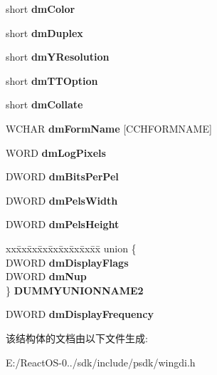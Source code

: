 \begin{DoxyCompactItemize}
\begin{tabbing}
\end{tabbing}\item 
\mbox{\label{struct__devicemode_w_af629c90bdef06e2b2b15ee471102a58e}} 
short {\bfseries dm\+Color}
\item 
\mbox{\label{struct__devicemode_w_a4b2dc9c4eb40cb65f1eb1f663fee7574}} 
short {\bfseries dm\+Duplex}
\item 
\mbox{\label{struct__devicemode_w_ac84418e4efc91b25b8ebc3cc38a8d51b}} 
short {\bfseries dm\+Y\+Resolution}
\item 
\mbox{\label{struct__devicemode_w_a06d241b62f61ebc8f5f9504af59cfa94}} 
short {\bfseries dm\+T\+T\+Option}
\item 
\mbox{\label{struct__devicemode_w_afc77f5b4a6608846ab790ded1a98d1f0}} 
short {\bfseries dm\+Collate}
\item 
\mbox{\label{struct__devicemode_w_ae09ab9adc64d0cbdff3962a2da589997}} 
W\+C\+H\+AR {\bfseries dm\+Form\+Name} \mbox{[}C\+C\+H\+F\+O\+R\+M\+N\+A\+ME\mbox{]}
\item 
\mbox{\label{struct__devicemode_w_ae9428dcab314e0f5290400b806ef4bcb}} 
W\+O\+RD {\bfseries dm\+Log\+Pixels}
\item 
\mbox{\label{struct__devicemode_w_a0872d6ac5f05c8dfc97bb8d08a2e2431}} 
D\+W\+O\+RD {\bfseries dm\+Bits\+Per\+Pel}
\item 
\mbox{\label{struct__devicemode_w_a6bb2cfe520addbc7b5c1be342f8cc32a}} 
D\+W\+O\+RD {\bfseries dm\+Pels\+Width}
\item 
\mbox{\label{struct__devicemode_w_aa60a069cdd5ef8ff30fa8677e4f2a253}} 
D\+W\+O\+RD {\bfseries dm\+Pels\+Height}
\item 
\mbox{\label{struct__devicemode_w_ad6bb89bd19827e2d279f9a629469d5a6}} 
\begin{tabbing}
xx\=xx\=xx\=xx\=xx\=xx\=xx\=xx\=xx\=\kill
union \{\\
\>DWORD {\bfseries dmDisplayFlags}\\
\>DWORD {\bfseries dmNup}\\
\} {\bfseries DUMMYUNIONNAME2}\\

\end{tabbing}\item 
\mbox{\label{struct__devicemode_w_ac26ae09bffb25ffeff58a4164de8b08c}} 
D\+W\+O\+RD {\bfseries dm\+Display\+Frequency}
\end{DoxyCompactItemize}


该结构体的文档由以下文件生成\+:\begin{DoxyCompactItemize}
\item 
E\+:/\+React\+O\+S-\/0../sdk/include/psdk/wingdi.\+h\end{DoxyCompactItemize}
